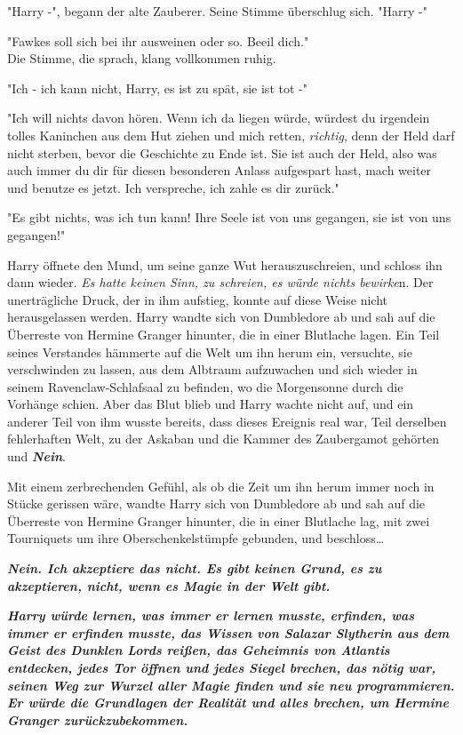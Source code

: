 {"Harry -", begann der alte Zauberer. Seine Stimme überschlug sich. "Harry -"

"Fawkes soll sich bei ihr ausweinen oder so. Beeil dich."\\ Die Stimme, die sprach, klang vollkommen ruhig.

"Ich - ich kann nicht, Harry, es ist zu spät, sie ist tot -"

"Ich will nichts davon hören. Wenn ich da liegen würde, würdest du irgendein tolles Kaninchen aus dem Hut ziehen und mich retten, \emph{richtig}, denn der Held darf nicht sterben, bevor die Geschichte zu Ende ist. Sie ist auch der Held, also was auch immer du dir für diesen besonderen Anlass aufgespart hast, mach weiter und benutze es jetzt. Ich verspreche, ich zahle es dir zurück."

"Es gibt nichts, was ich tun kann! Ihre Seele ist von uns gegangen, sie ist von uns gegangen!"

Harry öffnete den Mund, um seine ganze Wut herauszuschreien, und schloss ihn dann wieder. \emph{Es hatte keinen Sinn, zu schreien, es würde nichts bewirke}n. Der unerträgliche Druck, der in ihm aufstieg, konnte auf diese Weise nicht herausgelassen werden. Harry wandte sich von Dumbledore ab und sah auf die Überreste von Hermine Granger hinunter, die in einer Blutlache lagen. Ein Teil seines Verstandes hämmerte auf die Welt um ihn herum ein, versuchte, sie verschwinden zu lassen, aus dem Albtraum aufzuwachen und sich wieder in seinem Ravenclaw-Schlafsaal zu befinden, wo die Morgensonne durch die Vorhänge schien. Aber das Blut blieb und Harry wachte nicht auf, und ein anderer Teil von ihm wusste bereits, dass dieses Ereignis real war, Teil derselben fehlerhaften Welt, zu der Askaban und die Kammer des Zaubergamot gehörten und \textbf{\emph{Nein}}.

Mit einem zerbrechenden Gefühl, als ob die Zeit um ihn herum immer noch in Stücke gerissen wäre, wandte Harry sich von Dumbledore ab und sah auf die Überreste von Hermine Granger hinunter, die in einer Blutlache lag, mit zwei Tourniquets um ihre Oberschenkelstümpfe gebunden, und beschloss…

\textbf{\emph{Nein. Ich akzeptiere das nicht. Es gibt keinen Grund, es zu akzeptieren, nicht, wenn es Magie in der Welt gibt.}}

\textbf{\emph{Harry würde lernen, was immer er lernen musste, erfinden, was immer er erfinden musste, das Wissen von Salazar Slytherin aus dem Geist des Dunklen Lords reißen, das Geheimnis von Atlantis entdecken, jedes Tor öffnen und jedes Siegel brechen, das nötig war, seinen Weg zur Wurzel aller Magie finden und sie neu programmieren. Er würde die Grundlagen der Realität und alles brechen, um Hermine Granger zurückzubekommen.}}\\

}
